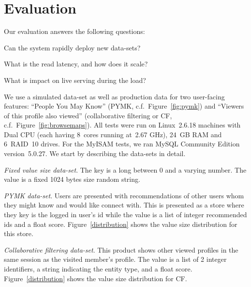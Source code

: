 \section{Evaluation}
\label{sec:evaluation}

Our evaluation answers the following questions:
\begin{compactenum}
\item Can the system rapidly deploy new data-sets?
\item What is the read latency, and how does it scale?
\item What is impact on live serving during the load?
\end{compactenum}

We use a simulated data-set as well as production data for two
user-facing features: ``People You May Know'' (PYMK,
c.f.~Figure~\ref{fig:pymk}) and ``Viewers of this profile also
viewed'' (collaborative filtering or CF,
c.f.~Figure~\ref{fig:browsemaps}). All tests were run on Linux~2.6.18
machines with Dual CPU (each having 8~cores running at~2.67 GHz),
24~GB RAM and 6~RAID~10 drives. For the MyISAM tests, we ran MySQL
Community Edition version~5.0.27. We start by describing the data-sets
in detail.

\begin{compactitem}
\item \emph{Fixed value size data-set}. The key is a long between
0 and a varying number. The value is a fixed 1024 bytes size random
string. 
\item \emph{PYMK data-set}. Users are presented with recommendations
of other users whom they might know and would like connect with. This
is presented as a store where they key is the logged in user's id
while the value is a list of integer recommended ids and a float
score. Figure~\ref{distribution} shows the value size distribution for
this store. 
\item \emph{Collaborative filtering data-set}. This product shows
other viewed profiles in the same session as the visited member's
profile. The value is a list of 2 integer identifiers, a string
indicating the entity type, and a float score.
Figure~\ref{distribution} shows the value size distribution for CF. 
\end{compactitem}

